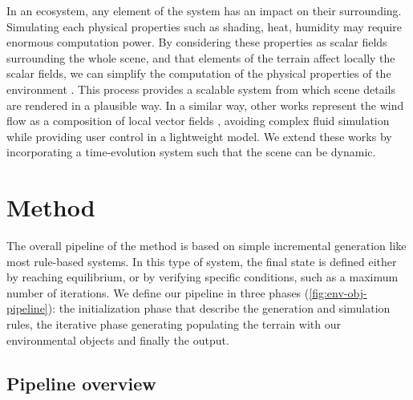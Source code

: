 In an ecosystem, any element of the system has an impact on their surrounding. Simulating each physical properties such as shading, heat, humidity may require enormous computation power. By considering these properties as scalar fields surrounding the whole scene, and that elements of the terrain affect locally the scalar fields, we can simplify the computation of the physical properties of the environment \cite{Grosbellet2016, Guerin2016a}. This process provides a scalable system from which scene details are rendered in a plausible way. In a similar way, other works represent the wind flow as a composition of local vector fields \cite{Wejchert1991}, avoiding complex fluid simulation while providing user control in a lightweight model. We extend these works by incorporating a time-evolution system such that the scene can be dynamic.


\section{Method}
\label{sec:env-obj-method}
The overall pipeline of the method is based on simple incremental generation like most rule-based systems. In this type of system, the final state is defined either by reaching equilibrium, or by verifying specific conditions, such as a maximum number of iterations. 
We define our pipeline in three phases (\cref{fig:env-obj-pipeline}): the initialization phase that describe the generation and simulation rules, the iterative phase generating populating the terrain with our environmental objects and finally the output.


\subsection{Pipeline overview}
\label{sec:env-obj-pipeline}

